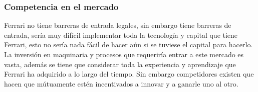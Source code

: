 \documentclass{article}
\begin{document}
\subsubsection{Competencia en el mercado}%
Ferrari no tiene barreras de entrada legales, sin embargo tiene barreras de entrada, sería muy difícil implementar toda la tecnología y capital que tiene Ferrari, esto no sería nada fácil de hacer aún si se tuviese el capital para hacerlo. La inversión en maquinaria y procesos que requeriría entrar a este mercado es vasta, además se tiene que considerar toda la experiencia y aprendizaje que Ferrari ha adquirido a lo largo del tiempo. Sin embargo competidores existen que hacen que mútuamente estén incentivados a innovar y a ganarle uno al otro.

\end{document}
